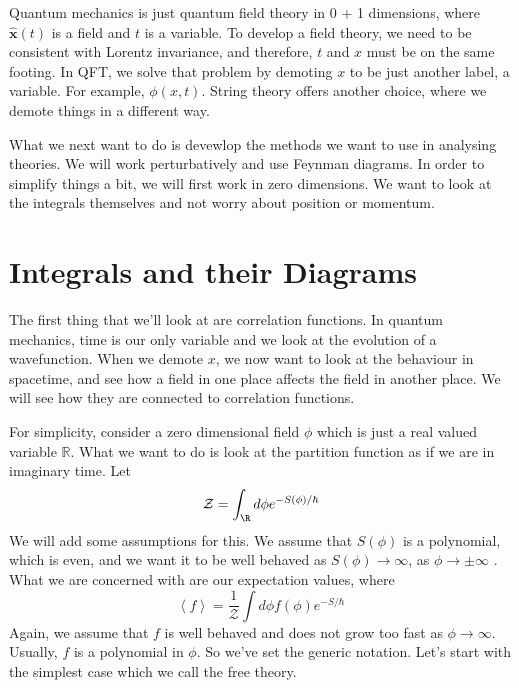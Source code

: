 \documentclass[11pt, oneside]{article}   	%
\theoremstyle{slanted}
\renewcommand{\op}[1]{\hat{\mathbf{#1}}}
\begin{document}
Quantum mechanics is just quantum field theory in 
0 + 1 dimensions, where $ \op{x } \left( t  \right)  $ is 
a field and $ t $ is a variable. 
To develop a field theory, we 
need to be consistent with Lorentz invariance,
and therefore, $ t $ and $ x $  must 
be on the same footing. 
In QFT, we solve that problem by demoting 
$ x $ to be just another label, a variable. 
For example, $ \phi \left( x, t  \right)  $. 
String theory offers another choice, where 
we demote things in a different way. 

What we next want to do is devewlop the 
methods we want to use in analysing theories. 
We will work perturbatively and use 
Feynman diagrams. 
In order to simplify things a bit, 
we will first work in zero dimensions. 
We want to look at the integrals themselves and not 
worry about position or momentum. 

\section{Integrals and their Diagrams}
The first thing that we'll look at 
are correlation functions. 
In quantum mechanics, time is our only variable 
and we look at the evolution of a wavefunction. 
When we demote $ x   $, we 
now want to look at the behaviour 
in spacetime, and see how a field in one place 
affects the field in another place. 
We will see how they are connected to correlation functions. 

For simplicity, 
consider a zero dimensional 
field 
$ \phi $ which is just a real valued 
variable $ \mathbb{ R } $. 
What we want to do is look at the partition function 
as if we are in imaginary time. 
Let 
\[
	\mathcal{ Z }  = \int _{ \R} d \phi  e^{  - S ( \phi  ) / \hbar} 
\] We will add some assumptions for this. 
We assume that $ S \left( \phi  \right)  $ is a polynomial, 
which is even, and we want it 
to be well behaved as $ S ( \phi ) \to \infty $, 
as $ \phi \to \pm \infty  $ . 
What we are concerned with are our expectation values, 
where 
\[
 \left< f  \right>  = \frac{1}{\mathcal{ Z }  } 
 \int d \phi f ( \phi ) e ^{  - S / \hbar }
\] Again, we assume that 
$ f $ is well behaved and does not 
grow too fast as $ \phi \to \infty $. 
Usually, $ f $ is a polynomial in $ \phi $. 
So we've set the generic notation. 
Let's start with the simplest case which we 
call the free theory. 
\end{document}
